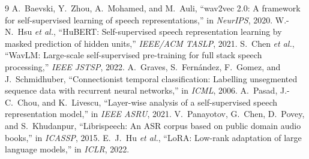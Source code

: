 \begin{thebibliography}{9}
\small
{} A.~Baevski, Y.~Zhou, A.~Mohamed, and M.~Auli,
``wav2vec 2.0: A framework for self-supervised learning of speech
representations,'' in \emph{NeurIPS}, 2020.
 W.-N.~Hsu \emph{et al.},
``HuBERT: Self-supervised speech representation learning by masked prediction
of hidden units,'' \emph{IEEE/ACM TASLP}, 2021.
 S.~Chen \emph{et al.},
``WavLM: Large-scale self-supervised pre-training for full stack speech
processing,'' \emph{IEEE JSTSP}, 2022.
 A.~Graves, S.~Fern\'andez, F.~Gomez, and J.~Schmidhuber,
``Connectionist temporal classification: Labelling unsegmented sequence data
with recurrent neural networks,'' in \emph{ICML}, 2006.
 A.~Pasad, J.-C.~Chou, and K.~Livescu,
``Layer-wise analysis of a self-supervised speech representation model,''
in \emph{IEEE ASRU}, 2021.
 V.~Panayotov, G.~Chen, D.~Povey, and S.~Khudanpur,
``Librispeech: An ASR corpus based on public domain audio books,''
in \emph{ICASSP}, 2015.
 E.~J.~Hu \emph{et al.},
``LoRA: Low-rank adaptation of large language models,'' in \emph{ICLR}, 2022.
\end{thebibliography}


